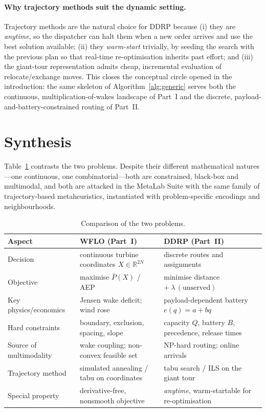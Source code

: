 \documentclass[11pt,a4paper]{article}
\newcommand{\R}{\mathbb{R}}
\begin{document}
\paragraph{Why trajectory methods suit the dynamic setting.}
Trajectory methods are the natural choice for DDRP because (i) they are
\emph{anytime}, so the dispatcher can halt them when a new order arrives and
use the best solution available; (ii) they \emph{warm-start} trivially, by
seeding the search with the previous plan so that real-time re-optimisation
inherits past effort; and (iii) the giant-tour representation admits cheap,
incremental evaluation of relocate/exchange moves. This closes the conceptual
circle opened in the introduction: the same skeleton of
Algorithm~\ref{alg:generic} serves both the continuous, multiplication-of-wakes
landscape of Part~I and the discrete, payload-and-battery-constrained routing
of Part~II.

\section{Synthesis}

Table~\ref{tab:synthesis} contrasts the two problems. Despite their different
mathematical natures---one continuous, one combinatorial---both are
constrained, black-box and multimodal, and both are attacked in the MetaLab
Suite with the same family of trajectory-based metaheuristics, instantiated
with problem-specific encodings and neighbourhoods.

\begin{table}[H]
\centering
\caption{Comparison of the two problems.}
\label{tab:synthesis}
\begin{tabular}{@{}p{3.1cm}p{5.3cm}p{5.3cm}@{}}
\toprule
Aspect & WFLO (Part~I) & DDRP (Part~II) \\
\midrule
Decision            & continuous turbine coordinates $X\in\R^{2N}$
                    & discrete routes and assignments \\
Objective           & maximise $\bar{P}(X)$ / AEP
                    & minimise distance $+\ \lambda\,(\text{unserved})$ \\
Key physics/economics & Jensen wake deficit; wind rose
                    & payload-dependent battery $e(q)=a+bq$ \\
Hard constraints    & boundary, exclusion, spacing, slope
                    & capacity $Q$, battery $B$, precedence, release times \\
Source of multimodality & wake coupling; non-convex feasible set
                    & NP-hard routing; online arrivals \\
Trajectory method   & simulated annealing / tabu on coordinates
                    & tabu search / ILS on the giant tour \\
Special property    & derivative-free, nonsmooth objective
                    & \emph{anytime}, warm-startable for re-optimisation \\
\bottomrule
\end{tabular}
\end{table}
\end{document}
